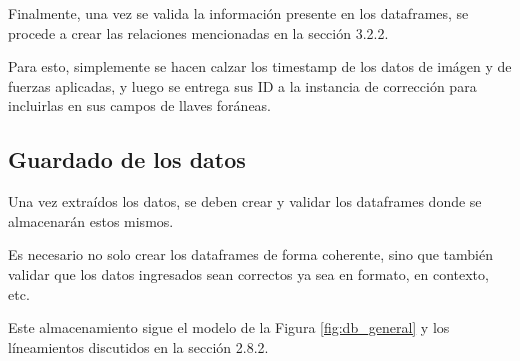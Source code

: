 Finalmente, una vez se valida la información presente en los dataframes, se procede a crear las relaciones mencionadas en la sección 3.2.2.

Para esto, simplemente se hacen calzar los timestamp de los datos de imágen y de fuerzas aplicadas, y luego se entrega sus ID a la instancia de corrección para incluirlas en sus campos de llaves foráneas.

\subsection{Guardado de los datos}

Una vez extraídos los datos, se deben crear y validar los dataframes donde se almacenarán estos mismos.

Es necesario no solo crear los dataframes de forma coherente, sino que también validar que los datos ingresados sean correctos ya sea en formato, en contexto, etc.

Este almacenamiento sigue el modelo de la Figura \ref{fig:db_general} y los líneamientos discutidos en la sección 2.8.2.